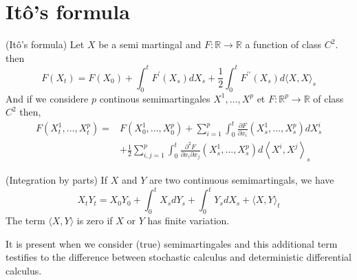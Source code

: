 \section{Itô's formula}
	\begin{theorem}
		(Itô's formula)
		Let $X$  be a semi martingal and $F: \mathbb{R} \rightarrow \mathbb{R}$ a function of class $C^{2} .$ then
		$$
		F\left(X_{t}\right)=F\left(X_{0}\right)+\int_{0}^{t} F^{\prime}\left(X_{s}\right) d X_{s}+\frac{1}{2} \int_{0}^{t} F^{\prime \prime}\left(X_{s}\right) d\langle X, X\rangle_{s}
		$$
		And if we considere $p$ continous semimartingales $X^{1}, \ldots, X^{p}$ et $F: \mathbb{R}^{p} \rightarrow \mathbb{R}$ of class $C^{2}$ then,
		$$
		\begin{aligned}
		F\left(X_{t}^{1}, \ldots, X_{t}^{p}\right)=& F\left(X_{0}^{1}, \ldots, X_{0}^{p}\right)+\sum_{i=1}^{p} \int_{0}^{t} \frac{\partial F}{\partial x_{i}}\left(X_{s}^{1}, \ldots, X_{s}^{p}\right) d X_{s}^{i} \\
		&+\frac{1}{2} \sum_{i, j=1}^{p} \int_{0}^{t} \frac{\partial^{2} F}{\partial x_{i} \partial x_{j}}\left(X_{s}^{1}, \ldots, X_{s}^{p}\right) d\left\langle X^{i}, X^{j}\right\rangle_{s}
		\end{aligned}
		$$
	\end{theorem}


	\begin{corollary}
		(Integration by parts) If $X$ and $Y$ are two continuous semimartingals, we have
		$$
		X_{t} Y_{t}=X_{0} Y_{0}+\int_{0}^{t} X_{s} d Y_{s}+\int_{0}^{t} Y_{s} d X_{s}+\langle X, Y\rangle_{t}
		$$
		The term $\langle X, Y\rangle$ is zero if $X$ or $Y$ has finite variation.
	\end{corollary}

	It is present when we consider (true) semimartingales and this additional term testifies to the difference between stochastic calculus and deterministic differential calculus.

